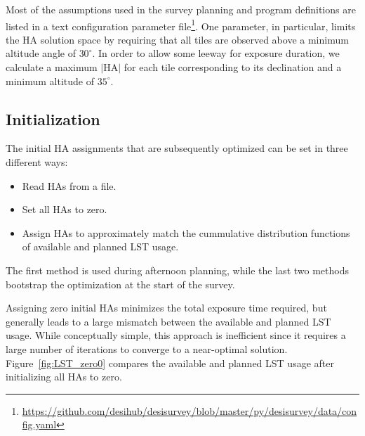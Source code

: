 \documentclass[12pt]{article}
\providecommand{\fig}[1]{Figure~\ref{fig:#1}}
\begin{document}
Most of the assumptions used in the survey planning and program definitions are listed in a text configuration parameter file\footnote{\url{https://github.com/desihub/desisurvey/blob/master/py/desisurvey/data/config.yaml}}. One parameter, in particular, limits the HA solution space by requiring that all tiles are observed above a minimum altitude angle of $30^\circ$.  In order to allow some leeway for exposure duration, we calculate a maximum $|\text{HA}|$ for each tile corresponding to its declination and a minimum altitude of $35^\circ$.

\subsection{Initialization}

The initial HA assignments that are subsequently optimized can be set in three different ways:
\begin{itemize}
    \item Read HAs from a file.
    \item Set all HAs to zero.
    \item Assign HAs to approximately match the cummulative distribution functions of available and planned LST usage.
\end{itemize}
The first method is used during afternoon planning, while the last two methods bootstrap the optimization at the start of the survey.

Assigning zero initial HAs minimizes the total exposure time required, but generally leads to a large mismatch between the available and planned LST usage. While conceptually simple, this approach is inefficient since it requires a large number of iterations to converge to a near-optimal solution. \fig{LST_zero0} compares the available and planned LST usage after initializing
all HAs to zero.
\end{document}

